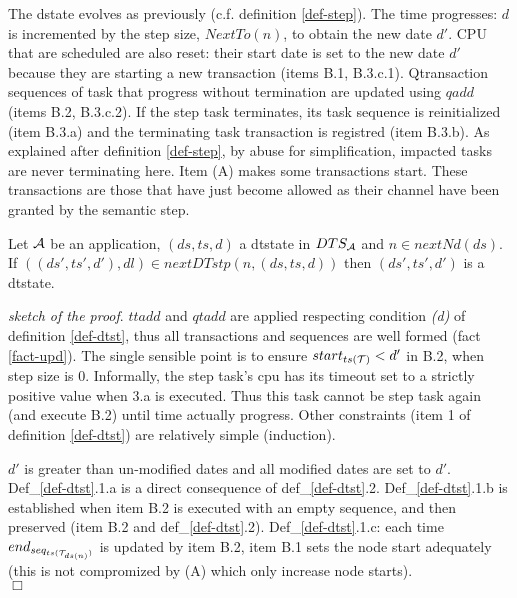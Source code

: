 \documentclass{article}
\begin{document}
The dstate evolves as previously (c.f. definition \ref{def-step}). The time progresses: $d$ is incremented by the step size, $NextT\!o(n)$, to obtain the new date $d'$. CPU that are scheduled are also reset: their start date is set to the new date $d'$ because they are starting a new transaction (items B.1, B.3.c.1). Qtransaction sequences of task that progress without termination are updated using $qadd$ (items B.2, B.3.c.2). If the step task terminates, its task sequence is reinitialized (item B.3.a) and the terminating task transaction is registred (item B.3.b). As explained after definition \ref{def-step}, by abuse for simplification, impacted tasks are never terminating here. Item (A) makes some transactions start. These transactions are those that have just become allowed as their channel have been granted by the semantic step.
\begin{fact}\label{fact-dtstp}Let ${\cal A}$ be an application, $(ds,ts,d)$ a dtstate in $DTS_{\cal A}$ and $n\in nextN\!d(ds)$. If $((ds',ts',d'),dl)\in nextDT\!stp(n,(ds,ts,d))$ then $(ds',ts',d')$ is a dtstate. 
\end{fact}
{\em sketch of the proof}. $ttadd$ and $qtadd$ are applied respecting condition {\em (d)} of definition \ref{def-dtst}, thus all transactions and sequences are well formed (fact \ref{fact-upd}). The single sensible point is to ensure $start_{ts({\cal T})}<d'$ in B.2, when step size is 0. Informally, the step task's cpu has its timeout set to a strictly positive value when 3.a is executed. Thus this task cannot be step task again (and execute B.2) until time actually progress. Other constraints (item 1 of definition \ref{def-dtst}) are relatively simple (induction). 

$d'$ is greater than un-modified dates and all modified dates are set to $d'$. Def\_\ref{def-dtst}.1.a is a direct consequence of def\_\ref{def-dtst}.2. Def\_\ref{def-dtst}.1.b is established when item B.2 is executed with an empty sequence, and then preserved (item B.2 and def\_\ref{def-dtst}.2). Def\_\ref{def-dtst}.1.c: each time $end_{seq_{ts({\cal T}_{ds(n)})}}$ is updated by item B.2, item B.1 sets the node start adequately (this is not compromized by (A) which only increase node starts). 
\\$\Box$
\end{document}
